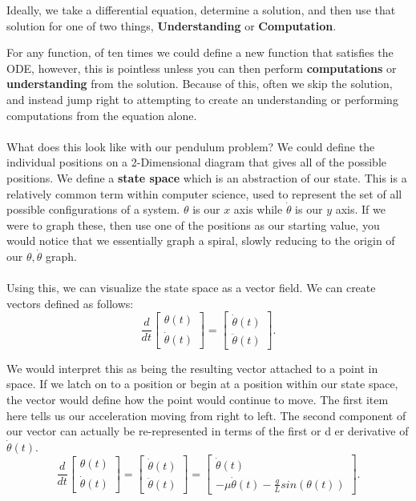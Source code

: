 \documentclass[10pt, oneside]{report}
\begin{document}
Ideally, we take a differential equation, determine a solution, and then use that solution for one of two things, \textbf{Understanding} or \textbf{Computation}.

For any function, of ten times we could define a new function that satisfies the ODE, however, this is pointless unless you can then perform \textbf{computations} or \textbf{understanding} from the solution.  Because of this, often we skip the solution, and instead jump right to attempting to create an understanding or performing computations from the equation alone.  
\\
\\
What does this look like with our pendulum problem? We could define the individual positions on a 2-Dimensional diagram that gives all of the possible positions.  We define a \textbf{state space} which is an abstraction of our state.  This is a relatively common term within computer science, used to represent the set of all possible configurations of a system.  $\theta$ is our $x$ axis while $\dot{\theta}$ is our $y$ axis.  If we were to graph these, then use one of the positions as our starting value, you would notice that we essentially graph a spiral, slowly reducing to the origin of our $\theta, \dot{\theta}$ graph.  
\\
\\
Using this, we can visualize the state space as a vector field.  We can create vectors defined as follows:
\[
\frac{d}{dt} \begin{bmatrix}
    \theta(t) \\
    \dot{\theta}(t)
\end{bmatrix} = 
\begin{bmatrix}
    \dot{\theta}(t)\\
    \ddot{\theta}(t)
    
\end{bmatrix}
.\] 

We would interpret this as being the resulting vector attached to a point in space.  If we latch on to a position or begin at a position within our state space, the vector would define how the point would continue to move. 
The first item here tells us our acceleration moving from right to left. The second component of our vector can actually be re-represented in terms of the first or d er derivative of $\dot{\theta}(t)$.
\[
\frac{d}{dt} \begin{bmatrix}
    \theta(t) \\
    \dot{\theta}(t)
\end{bmatrix} = 
\begin{bmatrix}
    \dot{\theta}(t)\\
    \ddot{\theta}(t)
    
\end{bmatrix} = 
\begin{bmatrix}
    \dot{\theta}(t)\\
    -\mu\dot{\theta}(t) - \frac{g}{L} sin (\theta(t))
\end{bmatrix}
.\] 
\end{document}
